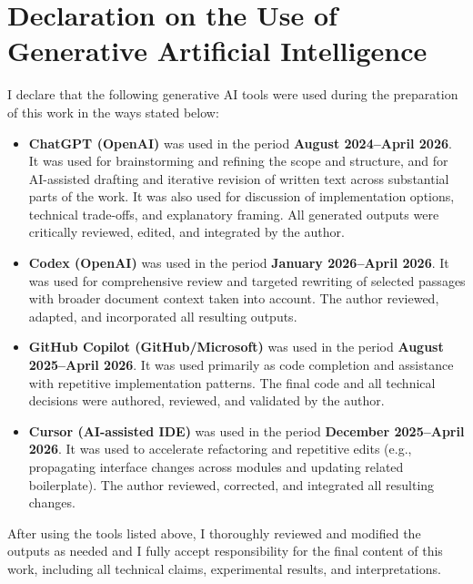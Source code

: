 \chapter*{Declaration on the Use of Generative Artificial Intelligence}

I declare that the following generative AI tools were used during the preparation of this work in the ways stated below:

\begin{itemize}
  \item \textbf{ChatGPT (OpenAI)} was used in the period \textbf{August 2024--April 2026}.
  It was used for brainstorming and refining the scope and structure, and for AI-assisted drafting and iterative revision of written text across substantial parts of the work. It was also used for discussion of implementation options, technical trade-offs, and explanatory framing. All generated outputs were critically reviewed, edited, and integrated by the author.

  \item \textbf{Codex (OpenAI)} was used in the period \textbf{January 2026--April 2026}.
  It was used for comprehensive review and targeted rewriting of selected passages with broader document context taken into account. The author reviewed, adapted, and incorporated all resulting outputs.

  \item \textbf{GitHub Copilot (GitHub/Microsoft)} was used in the period \textbf{August 2025--April 2026}.
  It was used primarily as code completion and assistance with repetitive implementation patterns. The final code and all technical decisions were authored, reviewed, and validated by the author.

  \item \textbf{Cursor (AI-assisted IDE)} was used in the period \textbf{December 2025--April 2026}.
  It was used to accelerate refactoring and repetitive edits (e.g., propagating interface changes across modules and updating related boilerplate). The author reviewed, corrected, and integrated all resulting changes.
\end{itemize}

After using the tools listed above, I thoroughly reviewed and modified the outputs as needed and I fully accept responsibility for the final content of this work, including all technical claims, experimental results, and interpretations.
